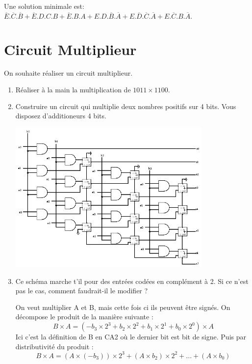 \documentclass[a4paper,10pt]{exam}
\begin{document}
\begin{enumerate}
\begin{solution}
        Une solution minimale est: $\overline{E}.\overline{C}.\overline{B} +
        \overline{E}.D.C.B + \overline{E}.B.A + E.D.\overline{B}.\overline{A} +
        E.\overline{D}.\overline{C}.\overline{A} + E.\overline{C}.B.\overline{A}$.
      \end{solution}
\end{enumerate}

\section{Circuit Multiplieur}

On souhaite réaliser un circuit multiplieur.
\begin{enumerate}
  \item Réaliser à la main la multiplication de $1011 \times 1100$.
  \item Construire un circuit qui multiplie deux nombres positifs
    sur 4 bits. Vous disposez d'additioneurs 4 bits.
    \begin{solution}
      \includegraphics[width=10cm]{4-mult}
    \end{solution}

  \item Ce schéma marche t'il pour des entrées codées en complément à 2.
    Si ce n'est pas le cas, comment faudrait-il le modifier ?
    \begin{solution}
      On veut multiplier A et B, mais cette fois ci ils peuvent être signés.
      On décompose le produit de la manière suivante :
      $$B \times A = ( -b_3 \times 2^3 + b_2 \times 2^2 + b_1 \times 2^1 + b_0 \times 2^0) \times A$$
      Ici c'est la définition de B en CA2 où le dernier bit est bit de signe. Puis par distributivité du produit :
      $$B \times A = (A \times( -b_3)) \times 2^3 + (A \times b_2) \times 2^2 + ... + (A \times b_0)$$


\end{solution}
\end{enumerate}
\end{document}
